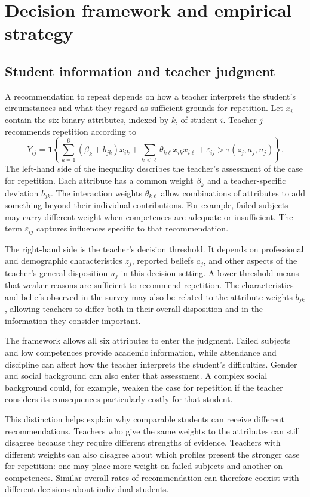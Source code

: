 \section{Decision framework and empirical strategy}\label{sec:strategy}
\subsection{Student information and teacher judgment}

A recommendation to repeat depends on how a teacher interprets the student's circumstances and what they regard as sufficient grounds for repetition. Let $x_i$ contain the six binary attributes, indexed by $k$, of student $i$. Teacher $j$ recommends repetition according to
\[
Y_{ij}=\mathbf{1}\left\{
\sum_{k=1}^{6}(\beta_k+b_{jk})x_{ik}
+\sum_{k<\ell}\theta_{k\ell}x_{ik}x_{i\ell}
+\varepsilon_{ij}
>\tau(z_j,a_j,u_j)
\right\}.
\]
The left-hand side of the inequality describes the teacher's assessment of the case for repetition. Each attribute has a common weight $\beta_k$ and a teacher-specific deviation $b_{jk}$. The interaction weights $\theta_{k\ell}$ allow combinations of attributes to add something beyond their individual contributions. For example, failed subjects may carry different weight when competences are adequate or insufficient. The term $\varepsilon_{ij}$ captures influences specific to that recommendation.

The right-hand side is the teacher's decision threshold. It depends on professional and demographic characteristics $z_j$, reported beliefs $a_j$, and other aspects of the teacher's general disposition $u_j$ in this decision setting. A lower threshold means that weaker reasons are sufficient to recommend repetition. The characteristics and beliefs observed in the survey may also be related to the attribute weights $b_{jk}$, allowing teachers to differ both in their overall disposition and in the information they consider important.

The framework allows all six attributes to enter the judgment. Failed subjects and low competences provide academic information, while attendance and discipline can affect how the teacher interprets the student's difficulties. Gender and social background can also enter that assessment. A complex social background could, for example, weaken the case for repetition if the teacher considers its consequences particularly costly for that student.

This distinction helps explain why comparable students can receive different recommendations. Teachers who give the same weights to the attributes can still disagree because they require different strengths of evidence. Teachers with different weights can also disagree about which profiles present the stronger case for repetition: one may place more weight on failed subjects and another on competences. Similar overall rates of recommendation can therefore coexist with different decisions about individual students.

